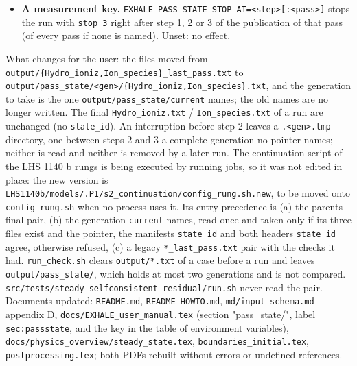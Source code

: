 \documentclass[english,a4paper]{my_memo}
\begin{document}
\begin{itemize}
  generation ends in \texttt{state\_id=\textless{}gen\textgreater{}} (\texttt{write\_coupling\_state\_header} takes
  it as an optional argument; no other file carries it). \texttt{load\_IC} reads it
  with the certification pair (\texttt{parse\_certification\_claim}) and
  \texttt{adopt\_certification\_claim} refuses a pair whose halves state two
  different ids, and a pair in which one half states an id and the other
  none. A pair in which neither states one (every final state, every older
  file) loads exactly as before; a pair that does prints the generation.
\item
  \textbf{A measurement key.} \texttt{EXHALE\_PASS\_STATE\_STOP\_AT=\textless{}step\textgreater{}{[}:\textless{}pass\textgreater{}{]}} stops
  the run with \texttt{stop\ 3} right after step 1, 2 or 3 of the publication of that
  pass (of every pass if none is named). Unset: no effect.
\end{itemize}

What changes for the user: the files moved from
\texttt{output/\{Hydro\_ioniz,Ion\_species\}\_last\_pass.txt} to
\texttt{output/pass\_state/\textless{}gen\textgreater{}/\{Hydro\_ioniz,Ion\_species\}.txt}, and the generation
to take is the one \texttt{output/pass\_state/current} names; the old names are no
longer written. The final \texttt{Hydro\_ioniz.txt} / \texttt{Ion\_species.txt} of a run are
unchanged (no \texttt{state\_id}). An interruption before step 2 leaves a
\texttt{.\textless{}gen\textgreater{}.tmp} directory, one between steps 2 and 3 a complete generation no
pointer names; neither is read and neither is removed by a later run. The
continuation script of the LHS 1140 b rungs is being executed by running
jobs, so it was not edited in place: the new version is
\texttt{LHS1140b/models/.P1/s2\_continuation/config\_rung.sh.new}, to be moved onto
\texttt{config\_rung.sh} when no process uses it. Its entry precedence is (a) the
parent\textquotesingle s final pair, (b) the generation \texttt{current} names, read once and taken
only if its three files exist and the pointer, the manifest\textquotesingle s \texttt{state\_id} and
both headers\textquotesingle{} \texttt{state\_id} agree, otherwise refused, (c) a legacy
\texttt{*\_last\_pass.txt} pair with the checks it had. \texttt{run\_check.sh} clears
\texttt{output/*.txt} of a case before a run and leaves \texttt{output/pass\_state/}, which
holds at most two generations and is not compared.
\texttt{src/tests/steady\_selfconsistent\_residual/run.sh} never read the pair.
Documents updated: \texttt{README.md}, \texttt{README\_HOWTO.md}, \texttt{md/input\_schema.md}
appendix D, \texttt{docs/EXHALE\_user\_manual.tex} (section "pass\_state/", label
\texttt{sec:passstate}, and the key in the table of environment variables),
\texttt{docs/physics\_overview/steady\_state.tex}, \texttt{boundaries\_initial.tex},
\texttt{postprocessing.tex}; both PDFs rebuilt without errors or undefined
references.
\end{document}
